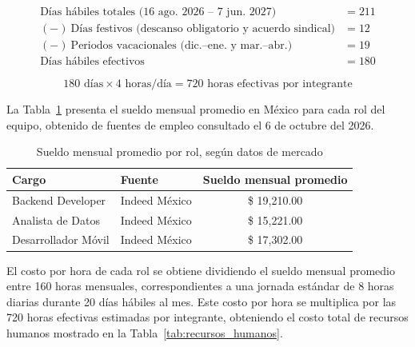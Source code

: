 

\begin{align*}
\text{Días hábiles totales (16 ago. 2026 -- 7 jun. 2027)} &= 211 \\
(-)\ \text{Días festivos (descanso obligatorio y acuerdo sindical)} &= 12 \\
(-)\ \text{Periodos vacacionales (dic.--ene. y mar.--abr.)} &= 19 \\
\hline
\text{Días hábiles efectivos} &= 180
\end{align*}

\[
180 \text{ días} \times 4 \text{ horas/día} = 720 \text{ horas efectivas por integrante}
\]


La Tabla~\ref{tab:sueldos_mercado} presenta el sueldo mensual promedio en México para cada rol del equipo, obtenido de fuentes de empleo consultado el 6 de octubre del 2026.

\begin{table}[htbp]
    \centering
    \caption[Sueldo mensual promedio por rol]{Sueldo mensual promedio por rol, según datos de mercado}
    \label{tab:sueldos_mercado}
    \begin{tabular}{|l|l|c|}
        \hline
        \textbf{Cargo} & \textbf{Fuente} & \textbf{Sueldo mensual promedio} \\ \hline
        Backend Developer & Indeed México \cite{indeed_backend_developer} & \$ 19,210.00 \\ \hline
        Analista de Datos & Indeed México \cite{indeed_analistas_datos} & \$ 15,221.00 \\ \hline
        Desarrollador Móvil & Indeed México \cite{indeed_android_developer} & \$ 17,302.00 \\ \hline
    \end{tabular}%
\end{table}

El costo por hora de cada rol se obtiene dividiendo el sueldo mensual promedio entre 160 horas mensuales, correspondientes a una jornada estándar de 8 horas diarias durante 20 días hábiles al mes. Este costo por hora se multiplica por las 720 horas efectivas estimadas por integrante, obteniendo el costo total de recursos humanos mostrado en la Tabla~\ref{tab:recursos_humanos}.

